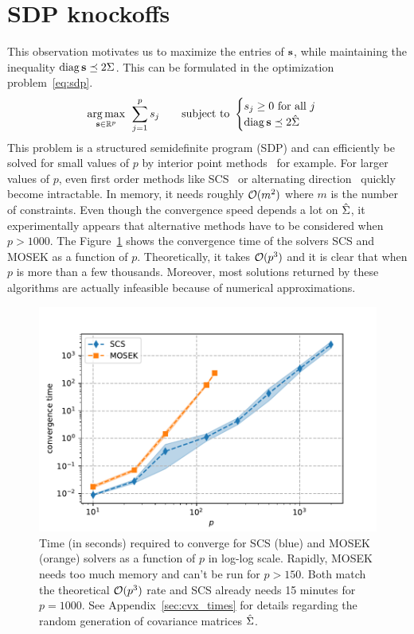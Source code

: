 \section{SDP knockoffs}\label{sec:sdp}

This observation motivates us to maximize the entries of $\mathbf{s}$,
while maintaining the inequality $\operatorname*{diag}\mathbf{s} \preceq 2\Sigma$.
This can be formulated in the optimization problem~\ref{eq:sdp}.
\begin{equation}\label{eq:sdp}
    \underset{\mathbf{s} \in \mathbb{R}^p}{\operatorname*{arg\,max}}\;\,
    \sum_{j = 1}^p s_j
    \qquad
    \text{subject to } \begin{cases}
        s_j \geq 0\text{ for all } j\\
        \operatorname*{diag} \mathbf{s} \preceq 2\hat{\Sigma}
    \end{cases}
\end{equation}
This problem is a structured semidefinite program (SDP) and can efficiently be solved for small values of
$p$ by interior point methods~\cite{interior_point_method_sdp} for example.
For larger values of $p$, even first order methods like
SCS~\cite{sdp_scs} or alternating direction~\cite{sdp_admm}
quickly become intractable.
In memory, it needs roughly $\mathcal{O}(m^2)$ where $m$ is the number of constraints.
Even though the convergence speed depends a lot on $\hat{\Sigma}$,
it experimentally appears that alternative methods have to be considered when $p > 1000$.
The Figure~\ref{fig:cvx_sdp_times} shows the convergence time of the solvers SCS and MOSEK as a function of $p$.
Theoretically, it takes $\mathcal{O}(p^3)$ and it is clear that when $p$ is more than a few thousands.
Moreover, most solutions returned by these algorithms are actually infeasible because of numerical approximations.

\begin{figure}
    \centering
    \includegraphics[width=0.8\linewidth, height=0.5\linewidth]{figures/cvx_sdp_times.pdf}
    \caption{
        Time (in seconds) required to converge for SCS (blue) and MOSEK (orange) solvers
        as a function of $p$ in log-log scale.
        Rapidly, MOSEK needs too much memory and can't be run for $p > 150$.
        Both match the theoretical $\mathcal{O}(p^3)$ rate and SCS already needs 15 minutes for $p = 1000$.
        See Appendix~\ref{sec:cvx_times} for details regarding the random generation of covariance
        matrices $\hat{\Sigma}$.
    }
    \label{fig:cvx_sdp_times}
\end{figure}

